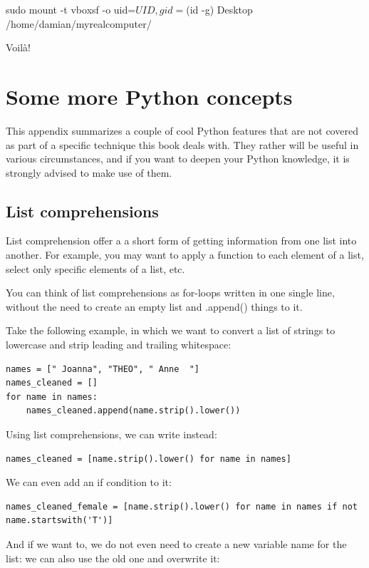\documentclass[a4paper,12pt]{book}
\begin{document}
\begin{appendices}
\begin{lstlistingbash}
sudo mount -t vboxsf -o uid=$UID,gid=$(id -g) Desktop /home/damian/myrealcomputer/
\end{lstlistingbash}

Voil\`a!



\chapter{Some more Python concepts}
\label{chap:pythongoodies}
This appendix summarizes a couple of cool Python features that are not covered as part of a specific technique this book deals with.
They rather will be useful in various circumstances, and if you want to deepen your Python knowledge, it is strongly advised to make use of them.


\section{List comprehensions}
\label{sec:listcomprehensions}
List comprehension offer a a short form of getting information from one list into another.
For example, you may want to apply a function to each element of a list, select only specific elements of a list, etc.

You can think of list comprehensions as for-loops written in one single line, without the need to create an empty list and .append() things to it.

Take the following example, in which we want to convert a list of strings to lowercase and strip leading and trailing whitespace:

\begin{lstlisting}
names = [" Joanna", "THEO", " Anne  "]
names_cleaned = []
for name in names:
    names_cleaned.append(name.strip().lower())
\end{lstlisting}

Using list comprehensions, we can write instead:
\begin{lstlisting}
names_cleaned = [name.strip().lower() for name in names]
\end{lstlisting}

We can even add an if condition to it:

\begin{lstlisting}
names_cleaned_female = [name.strip().lower() for name in names if not name.startswith('T')]
\end{lstlisting}

And if we want to, we do not even need to create a new variable name for the list: we can also use the old one and overwrite it:


\end{appendices}
\end{document}

